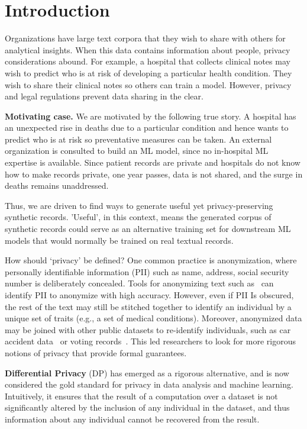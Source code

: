 \section{Introduction}
\label{sec:intro}



Organizations have large text corpora that they wish to share with others for analytical insights.  When this data contains information about people, privacy considerations abound.  For example, a hospital that collects clinical notes may wish to predict who is at risk of developing a particular health condition.  
They wish to share their clinical notes so others can train a model.  However, privacy and legal regulations prevent data sharing in the clear.

\noindent\textbf{Motivating case.}
We are motivated by the following true story. A hospital has an unexpected rise in deaths due to a particular condition and hence wants to predict who is at risk so preventative measures can be taken. An external organization is consulted to build an ML model, since no in-hospital ML expertise is available. Since patient records are private and hospitals do not know how to make records private, one year passes, data is not shared, and the surge in deaths remains unaddressed.

Thus, we are driven to find ways to generate useful yet privacy-preserving synthetic records. 'Useful', in this context, means the generated corpus of synthetic records could serve as an alternative training set for downstream ML models that would normally be trained on real textual records. 

How should `privacy' be defined?
One common practice %
is anonymization, where personally identifiable information (PII) such as name, address, social security number is deliberately concealed.  Tools for anonymizing text such as~\cite{philter,comprehendMedical} can identify PII to anonymize with high accuracy.  However, even if PII Is obscured, the rest of the text may still be stitched together to identify an individual by a unique set of traits (e.g., a set of medical conditions).  Moreover, anonymized data may be joined with other public datasets to re-identify individuals, such as car accident data~\cite{car_accidents} or voting records~\cite{latanya}.  
This led researchers to look for more rigorous notions of privacy that provide formal guarantees. 

\noindent\textbf{Differential Privacy} (DP)
\cite{dwork2006calibrating} has emerged as a rigorous alternative, and is now considered the gold standard for privacy in data analysis and machine learning. Intuitively, it ensures that the result of a computation over a dataset is not significantly altered by the inclusion of any individual in the dataset, and thus information about any individual cannot be recovered from the result. 

